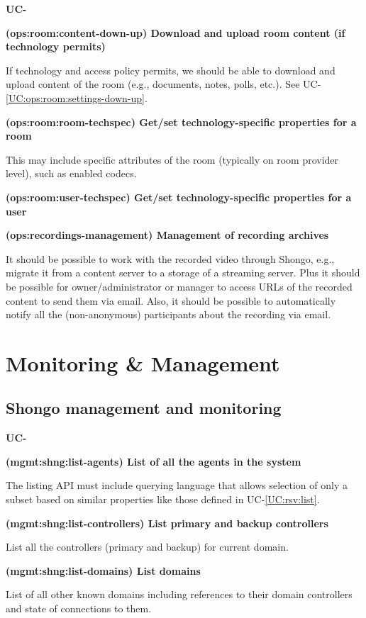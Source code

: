 \documentclass[a4paper]{report}
\makeatletter
\newcounter{UCcounter}
\newenvironment{UseCases}%
	{\begin{list}{\textbf{UC-\arabic{UCcounter}}}{\@nmbrlisttrue\def\@listctr{UCcounter}}}%
	{\end{list}}
\newcommand{\UClabel}[1]{\label{UC:#1}}
\newcommand{\UCref}[1]{UC-\ref{UC:#1}}
\newcommand{\UseCase}[2]{\item\UClabel{#2} \textbf{(#2) #1}\\ \nopagebreak}
\makeatother
\begin{document}
\begin{UseCases}
\UseCase{Download and upload room content (if technology
permits)}{ops:room:content-down-up}

If technology and access policy permits, we should be able to download and
upload content of the room (e.g., documents, notes, polls, etc.). See
\UCref{ops:room:settings-down-up}.

\UseCase{Get/set technology-specific properties for a
room}{ops:room:room-techspec}

This may include specific attributes of the room (typically on room provider
level), such as enabled codecs.

\UseCase{Get/set technology-specific properties for a
user}{ops:room:user-techspec}

\UseCase{Management of recording archives}{ops:recordings-management}

It should be possible to work with the recorded video through Shongo, e.g.,
migrate it from a content server to a storage of a streaming server. Plus it
should be possible for owner/administrator or manager to access URLs of the
recorded content to send them via email. Also, it should be possible to
automatically notify all the (non-anonymous) participants about the recording
via email.

\end{UseCases}



\section{Monitoring \& Management}

\subsection{Shongo management and monitoring}

\begin{UseCases}

\UseCase{List of all the agents in the system}{mgmt:shng:list-agents}

The listing API must include querying language that allows selection of only
a subset based on similar properties like those defined in \UCref{rsv:list}.

\UseCase{List primary and backup controllers}{mgmt:shng:list-controllers}

List all the controllers (primary and backup) for current domain.

\UseCase{List domains}{mgmt:shng:list-domains}

List of all other known domains including references to their domain
controllers and state of connections to them.

\end{UseCases}
\end{document}

